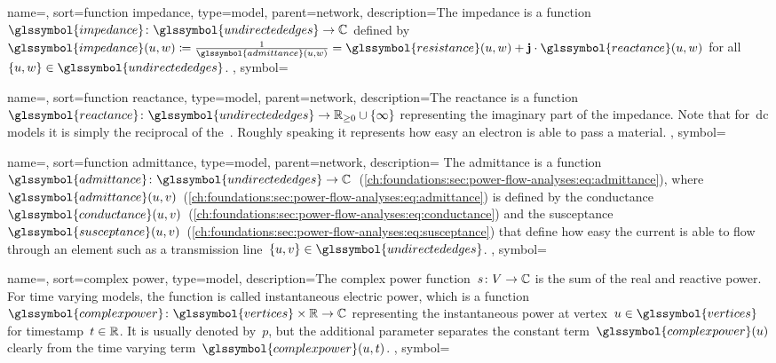 {
    name={\impedance},
    sort={function impedance},
    type={model},
    parent={network},
    description={The impedance is a
    function~$\glssymbol{impedance}\colon\glssymbol{undirectededges}\to\complexes$
    defined by~$
        \glssymbol{impedance}(\vertexa,\vertexc) \coloneqq 
        \frac{1}{\glssymbol{admittance}(\vertexa,\vertexc)} 
    =
        \glssymbol{resistance}(\vertexa,\vertexc) 
    + 
        \imgPart\cdot\glssymbol{reactance}(\vertexa,\vertexc)
    $
    for all~$\{\vertexa,\vertexc\}\in\glssymbol{undirectededges}$.
    },
    symbol={\impedance}
}

{
    name={\reactance},
    sort={function reactance},
    type={model},
    parent={network},
    description={The reactance is a
    function~$\glssymbol{reactance}\colon
    \glssymbol{undirectededges}\to\posreals\cup\{\infty\}$ representing the
    imaginary part of the impedance. Note that for~\gls{dc} models it is simply
    the reciprocal of the~. Roughly speaking it
    represents how easy an electron is able to pass a material.
    },
    symbol={\reactance}
}

{
    name={\admittance},
    sort={function admittance},
    type={model},
    parent={network},
    description={
    The admittance is a
    function~$\glssymbol{admittance}\colon\glssymbol{undirectededges}\to\complexes$~(\cref{ch:foundations:sec:power-flow-analyses:eq:admittance}), where
    $\glssymbol{admittance}(\vertexa,\vertexb)$~(\cref{ch:foundations:sec:power-flow-analyses:eq:admittance}) is defined by
    the
    conductance~$\glssymbol{conductance}(\vertexa,\vertexb)$~(\cref{ch:foundations:sec:power-flow-analyses:eq:conductance})
    and the
    susceptance~$\glssymbol{susceptance}(\vertexa,\vertexb)$~(\cref{ch:foundations:sec:power-flow-analyses:eq:susceptance})
    that define how easy the current is able to flow through an element such as
    a transmission line~$\{\vertexa,\vertexb\}\in\glssymbol{undirectededges}$.
    },
    symbol={\admittance}
}

{
    name={\complexpower},
    sort={complex power},
    type={model},
    description={The complex power
    function~$s\colon V\to\mathbb{C}$ is the sum of the real
    and reactive power. For time varying models, the function is called
    instantaneous electric power, which is a
    function~$\glssymbol{complexpower}\colon\glssymbol{vertices}\times\reals\to\complexes$
    representing the instantaneous power at
    vertex~$\vertexa\in\glssymbol{vertices}$ for
    timestamp~$t\in\mathbb{R}$. It is usually denoted by~$p$, but the
    additional parameter separates the constant
    term~$\glssymbol{complexpower}(\vertexa)$ clearly from the time varying
    term~$\glssymbol{complexpower}(\vertexa,\timestamp)$.
    },
    symbol={\complexpower}
}

